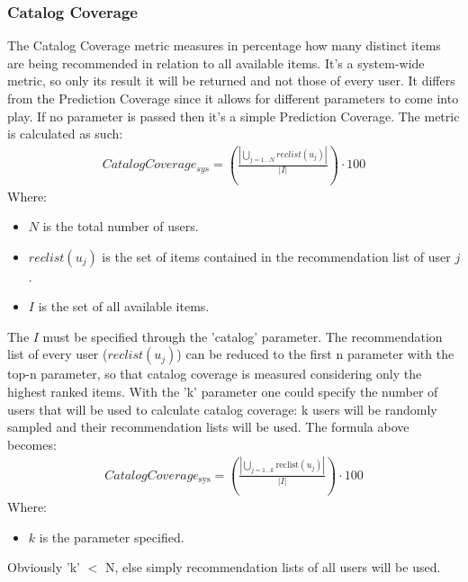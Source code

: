 \documentclass[11pt]{article}
\begin{document}
\subsubsection{Catalog Coverage}\label{subsubsec:cat_cov}
The Catalog Coverage metric measures in percentage how many distinct items are being recommended in relation
to all available items.
It's a system-wide metric, so only its result it will be returned and not those of every user.
It differs from the Prediction Coverage since it allows for different parameters to come into play.
If no parameter is passed then it's a simple Prediction Coverage.
The metric is calculated as such:
\hfill\break
\hfill\break
    \[
        \begin{gathered}
            Catalog Coverage_{sys} = (\frac{|\bigcup_{j=1...N}reclist(u_j)|}{|I|})\cdot100
        \end{gathered}
    \]
\hfill\break
\hfill\break
    Where:
\begin{itemize}
    \item $N$ is the total number of users.
    \item $reclist(u_j)$ is the set of items contained in the recommendation list of user $j$.
    \item $I$ is the set of all available items.
\end{itemize}
\hfill\break
\hfill\break
The $I$ must be specified through the 'catalog' parameter.
The recommendation list of every user ($reclist(u_j)$) can be reduced to the first n parameter with the top-n parameter,
so that catalog coverage is measured considering only the highest ranked items.
With the 'k' parameter one could specify the number of users that will be used to
calculate catalog coverage: k users will be randomly sampled and their recommendation lists will be used.
The formula above becomes:
\hfill\break
\hfill\break
    \[
       \begin{gathered}
         Catalog Coverage_{\text{sys}} = \left(\frac{|\bigcup_{j=1\ldots k} \text{reclist}(u_j)|}{|I|}\right) \cdot 100
       \end{gathered}
    \]
\hfill\break
\hfill\break
    Where:
\begin{itemize}
    \item $k$ is the parameter specified.
\end{itemize}
\hfill\break
\hfill\break
Obviously 'k' $<$ N, else simply recommendation lists of all users will be used.
\hfill\break
\hfill\break
\end{document}
